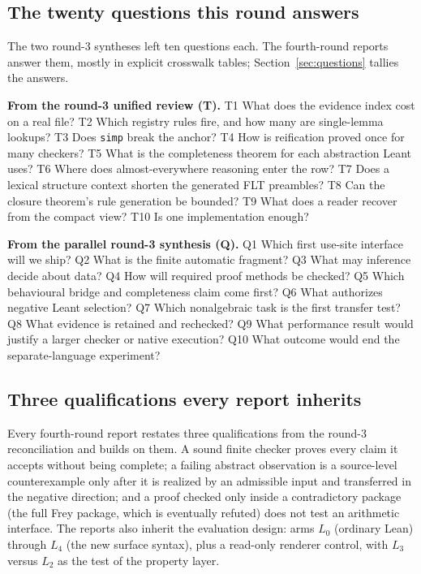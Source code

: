 \documentclass[11pt,a4paper]{article}
\newcommand{\code}[1]{\nolinkurl{#1}}
\theoremstyle{definition}
\theoremstyle{plain}
\begin{document}
\subsection{The twenty questions this round answers}\label{sec:20}
The two round-3 syntheses left ten questions each. The fourth-round reports answer them, mostly in explicit crosswalk tables; Section~\ref{sec:questions} tallies the answers.
\begin{keybox}
\textbf{From the round-3 unified review (T).} T1 What does the evidence index cost on a real file? T2 Which registry rules fire, and how many are single-lemma lookups? T3 Does \code{simp} break the anchor? T4 How is reification proved once for many checkers? T5 What is the completeness theorem for each abstraction Leant uses? T6 Where does almost-everywhere reasoning enter the row? T7 Does a lexical structure context shorten the generated FLT preambles? T8 Can the closure theorem's rule generation be bounded? T9 What does a reader recover from the compact view? T10 Is one implementation enough?

\textbf{From the parallel round-3 synthesis (Q).} Q1 Which first use-site interface will we ship? Q2 What is the finite automatic fragment? Q3 What may inference decide about data? Q4 How will required proof methods be checked? Q5 Which behavioural bridge and completeness claim come first? Q6 What authorizes negative Leant selection? Q7 Which nonalgebraic task is the first transfer test? Q8 What evidence is retained and rechecked? Q9 What performance result would justify a larger checker or native execution? Q10 What outcome would end the separate-language experiment?
\end{keybox}

\subsection{Three qualifications every report inherits}
Every fourth-round report restates three qualifications from the round-3 reconciliation and builds on them. A sound finite checker proves every claim it accepts without being complete; a failing abstract observation is a source-level counterexample only after it is realized by an admissible input and transferred in the negative direction; and a proof checked only inside a contradictory package (the full Frey package, which is eventually refuted) does not test an arithmetic interface. The reports also inherit the evaluation design: arms $L_0$ (ordinary Lean) through $L_4$ (the new surface syntax), plus a read-only renderer control, with $L_3$ versus $L_2$ as the test of the property layer.
\end{document}
